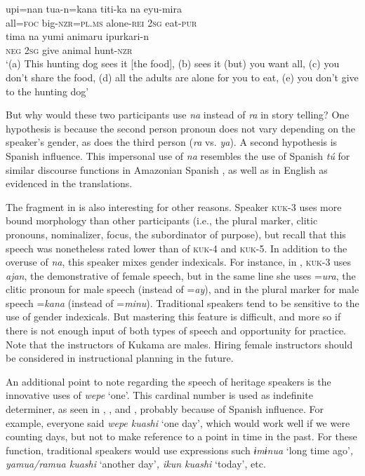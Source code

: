 \documentclass[output=paper]{langscibook}
\begin{document}
\ex\label{ex:7:5d}
\gll upi=nan   tua-n=kana     titi-ka     na   eyu-mira\\
   all=\textsc{foc}  big-\textsc{nzr=pl.ms}  alone-\textsc{rei}  \textsc{2sg}  eat-\textsc{pur}\\

\ex\label{ex:7:5e}
\gll tima     na   yumi   animaru   ipurkari-n\\
    \textsc{neg}    \textsc{2sg}  give  animal    hunt-\textsc{nzr}\\
\glt ‘(a) This hunting dog sees it [the food], (b) sees it (but) you want all, (c) you don’t share the food, (d) all the adults are alone for you to eat, (e) you don’t give to the hunting dog’
\z
\z

But why would these two participants use \textit{na} instead of \textit{ra} in story telling? One hypothesis is because the second person pronoun does not vary depending on the speaker’s gender, as does the third person (\textit{ra} vs. \textit{ya}). A second hypothesis is Spanish influence. This impersonal use of \textit{na} resembles the use of Spanish \textit{tú} for similar discourse functions in Amazonian Spanish \citep{VallejosEtAl2020}, as well as in English as evidenced in the translations.

The fragment in  is also interesting for other reasons. Speaker \textsc{kuk}{}-3 uses more bound morphology than other participants (i.e., the plural marker, clitic pronouns, nominalizer, focus, the subordinator of purpose), but recall that this speech was nonetheless rated lower than of \textsc{kuk}{}-4 and \textsc{kuk}{}-5. In addition to the overuse of \textit{na}, this speaker mixes gender indexicals. For instance, in , \textsc{kuk}{}-3 uses \textit{ajan}, the demonstrative of female speech, but in the same line she uses =\textit{ura}, the clitic pronoun for male speech (instead of =\textit{ay}), and in  the plural marker for male speech =\textit{kana} (instead of =\textit{minu}). Traditional speakers tend to be sensitive to the use of gender indexicals. But mastering this feature is difficult, and more so if there is not enough input of both types of speech and opportunity for practice. Note that the instructors of Kukama are males. Hiring female instructors should be considered in instructional planning in the future.

An additional point to note regarding the speech of heritage speakers is the innovative uses of \textit{wepe} ‘one’. This cardinal number is used as indefinite determiner, as seen in , , and , probably because of Spanish influence. For example, everyone said \textit{wepe kuashi} ‘one day’, which would work well if we were counting days, but not to make reference to a point in time in the past. For these function, traditional speakers would use expressions such \textit{ɨmɨnua} ‘long time ago’\textit{, yamua/ramua kuashi} ‘another day’\textit{, ikun kuashi} ‘today’, etc.
\end{document}
